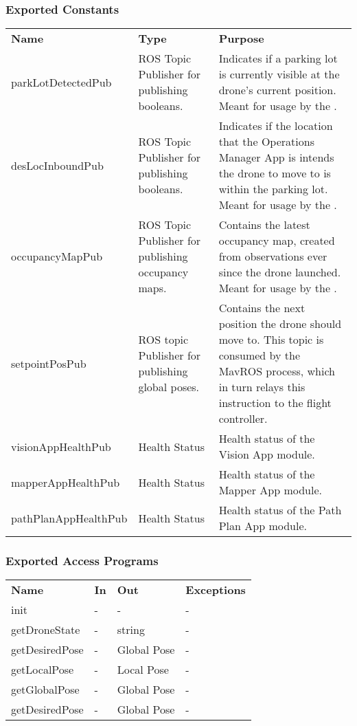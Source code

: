 \documentclass[12pt, titlepage]{article}
\begin{document}
\subsubsection{Exported Constants}
\begin{center}
\begin{tabular}{p{4cm} p{3cm} p{7.8cm}}
\hline
\textbf{Name} & \textbf{Type} & \textbf{Purpose} \\
parkLotDetectedPub & ROS Topic Publisher for publishing booleans. &  Indicates if a parking lot is currently visible at the drone's current position. Meant for usage by the \nameref{Operations Manager}. \\
desLocInboundPub & ROS Topic Publisher for publishing booleans. &  Indicates if the location that the Operations Manager App is intends the drone to move to is within the parking lot. Meant for usage by the \nameref{Operations Manager}. \\
occupancyMapPub  & ROS Topic Publisher for publishing occupancy maps. &  Contains the latest occupancy map, created from observations ever since the drone launched. Meant for usage by the \nameref{Operations Manager}. \\
setpointPosPub & ROS topic Publisher for publishing global poses. &  Contains the next position the drone should move to. This topic is consumed by the MavROS process, which in turn relays this instruction to the flight controller. \\
visionAppHealthPub & Health Status & Health status of the Vision App module.  \\
mapperAppHealthPub & Health Status & Health status of the Mapper App module.  \\
pathPlanAppHealthPub & Health Status & Health status of the Path Plan App module.  \\
\hline
\hline
\end{tabular}
\end{center}
\subsubsection{Exported Access Programs}
\begin{center}
\begin{tabular}{p{3.5cm} p{2.5cm} p{2.5cm} p{5cm}}
\hline
\textbf{Name} & \textbf{In} & \textbf{Out} & \textbf{Exceptions} \\
init &  - & - & - \\
getDroneState &  - & string & - \\
getDesiredPose & - & Global Pose & - \\
getLocalPose & - & Local Pose & - \\
getGlobalPose & - & Global Pose & - \\
getDesiredPose & - & Global Pose & - \\
\hline
\hline
\end{tabular}
\end{center}
\end{document}
